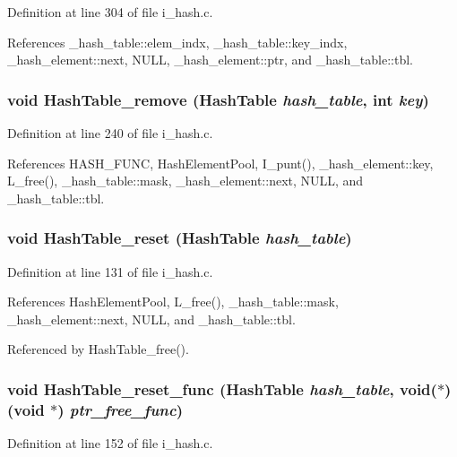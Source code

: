 Definition at line 304 of file i\_\-hash.c.

References \_\-hash\_\-table::elem\_\-indx, \_\-hash\_\-table::key\_\-indx, \_\-hash\_\-element::next, NULL, \_\-hash\_\-element::ptr, and \_\-hash\_\-table::tbl.
\subsubsection{\setlength{\rightskip}{0pt plus 5cm}void Hash\-Table\_\-remove (\bf{Hash\-Table} {\em hash\_\-table}, int {\em key})}\label{i__hash_8h_c6da04ef7158c1acb2f51ace02a6328d}




Definition at line 240 of file i\_\-hash.c.

References HASH\_\-FUNC, Hash\-Element\-Pool, I\_\-punt(), \_\-hash\_\-element::key, L\_\-free(), \_\-hash\_\-table::mask, \_\-hash\_\-element::next, NULL, and \_\-hash\_\-table::tbl.
\subsubsection{\setlength{\rightskip}{0pt plus 5cm}void Hash\-Table\_\-reset (\bf{Hash\-Table} {\em hash\_\-table})}\label{i__hash_8h_20bd9c4f2ba872347f363ba175dbd9a3}




Definition at line 131 of file i\_\-hash.c.

References Hash\-Element\-Pool, L\_\-free(), \_\-hash\_\-table::mask, \_\-hash\_\-element::next, NULL, and \_\-hash\_\-table::tbl.

Referenced by Hash\-Table\_\-free().
\subsubsection{\setlength{\rightskip}{0pt plus 5cm}void Hash\-Table\_\-reset\_\-func (\bf{Hash\-Table} {\em hash\_\-table}, void($\ast$)(void $\ast$) {\em ptr\_\-free\_\-func})}\label{i__hash_8h_bd05eb52a931576fa22dd08b47aa2411}




Definition at line 152 of file i\_\-hash.c.

